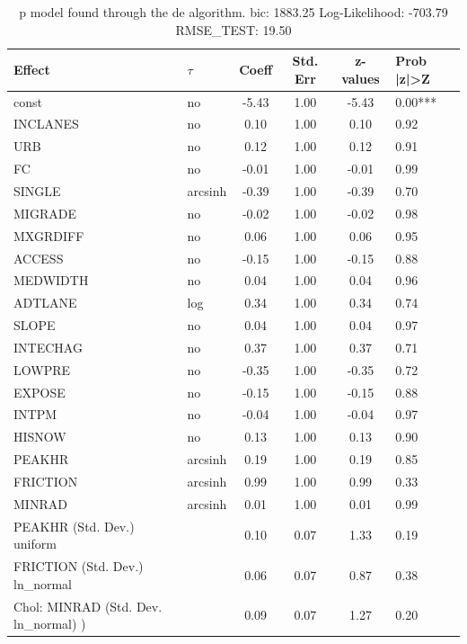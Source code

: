 \begin{table}
	\caption{p model found through the de algorithm. bic: 1883.25 Log-Likelihood: -703.79 RMSE_TEST: 19.50}
	\begin{center}
		\begin{tabular}{|l|l|c|c|c|l|}
			\hline
			Effect & $\tau$ & Coeff & Std. Err & z-values & Prob |z|>Z \\
			\hline
			const & no & -5.43 & 1.00 & -5.43 & 0.00*** \\
			\hline
			INCLANES & no & 0.10 & 1.00 & 0.10 & 0.92 \\
			\hline
			URB & no & 0.12 & 1.00 & 0.12 & 0.91 \\
			\hline
			FC & no & -0.01 & 1.00 & -0.01 & 0.99 \\
			\hline
			SINGLE & arcsinh & -0.39 & 1.00 & -0.39 & 0.70 \\
			\hline
			MIGRADE & no & -0.02 & 1.00 & -0.02 & 0.98 \\
			\hline
			MXGRDIFF & no & 0.06 & 1.00 & 0.06 & 0.95 \\
			\hline
			ACCESS & no & -0.15 & 1.00 & -0.15 & 0.88 \\
			\hline
			MEDWIDTH & no & 0.04 & 1.00 & 0.04 & 0.96 \\
			\hline
			ADTLANE & log & 0.34 & 1.00 & 0.34 & 0.74 \\
			\hline
			SLOPE & no & 0.04 & 1.00 & 0.04 & 0.97 \\
			\hline
			INTECHAG & no & 0.37 & 1.00 & 0.37 & 0.71 \\
			\hline
			LOWPRE & no & -0.35 & 1.00 & -0.35 & 0.72 \\
			\hline
			EXPOSE & no & -0.15 & 1.00 & -0.15 & 0.88 \\
			\hline
			INTPM & no & -0.04 & 1.00 & -0.04 & 0.97 \\
			\hline
			HISNOW & no & 0.13 & 1.00 & 0.13 & 0.90 \\
			\hline
			PEAKHR & arcsinh & 0.19 & 1.00 & 0.19 & 0.85 \\
			\hline
			FRICTION & arcsinh & 0.99 & 1.00 & 0.99 & 0.33 \\
			\hline
			MINRAD & arcsinh & 0.01 & 1.00 & 0.01 & 0.99 \\
			\hline
			PEAKHR (Std. Dev.) uniform &  & 0.10 & 0.07 & 1.33 & 0.19 \\
			\hline
			FRICTION (Std. Dev.) ln_normal &  & 0.06 & 0.07 & 0.87 & 0.38 \\
			\hline
			 Chol: MINRAD (Std. Dev. ln_normal) ) &  & 0.09 & 0.07 & 1.27 & 0.20 \\
			\hline
		\end{tabular}
	\end{center}
\end{table}